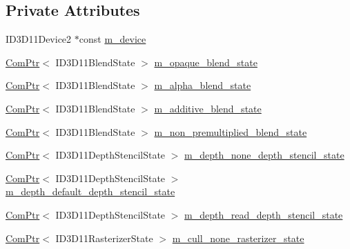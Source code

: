 \subsection*{Private Attributes}
\begin{DoxyCompactItemize}
\item 
I\+D3\+D11\+Device2 $\ast$const \hyperlink{structmage_1_1_rendering_state_cache_ad1846bcede5c3e6c8ce631b504b45cdf}{m\+\_\+device}
\item 
\hyperlink{namespacemage_ae74f374780900893caa5555d1031fd79}{Com\+Ptr}$<$ I\+D3\+D11\+Blend\+State $>$ \hyperlink{structmage_1_1_rendering_state_cache_ac655dae04386c2998677dff61704c975}{m\+\_\+opaque\+\_\+blend\+\_\+state}
\item 
\hyperlink{namespacemage_ae74f374780900893caa5555d1031fd79}{Com\+Ptr}$<$ I\+D3\+D11\+Blend\+State $>$ \hyperlink{structmage_1_1_rendering_state_cache_a4eda3c0aeeaca45e4e07358267bb8ae6}{m\+\_\+alpha\+\_\+blend\+\_\+state}
\item 
\hyperlink{namespacemage_ae74f374780900893caa5555d1031fd79}{Com\+Ptr}$<$ I\+D3\+D11\+Blend\+State $>$ \hyperlink{structmage_1_1_rendering_state_cache_ae29d186475c245d3eb5701005631c655}{m\+\_\+additive\+\_\+blend\+\_\+state}
\item 
\hyperlink{namespacemage_ae74f374780900893caa5555d1031fd79}{Com\+Ptr}$<$ I\+D3\+D11\+Blend\+State $>$ \hyperlink{structmage_1_1_rendering_state_cache_adaf1dd35ebb8e0ad9f2135ad0efee67a}{m\+\_\+non\+\_\+premultiplied\+\_\+blend\+\_\+state}
\item 
\hyperlink{namespacemage_ae74f374780900893caa5555d1031fd79}{Com\+Ptr}$<$ I\+D3\+D11\+Depth\+Stencil\+State $>$ \hyperlink{structmage_1_1_rendering_state_cache_a2dfd8ceaab6604f77bda85900d0ebd0a}{m\+\_\+depth\+\_\+none\+\_\+depth\+\_\+stencil\+\_\+state}
\item 
\hyperlink{namespacemage_ae74f374780900893caa5555d1031fd79}{Com\+Ptr}$<$ I\+D3\+D11\+Depth\+Stencil\+State $>$ \hyperlink{structmage_1_1_rendering_state_cache_ad7f220ca4bc92d814e3e9044b0edf7e2}{m\+\_\+depth\+\_\+default\+\_\+depth\+\_\+stencil\+\_\+state}
\item 
\hyperlink{namespacemage_ae74f374780900893caa5555d1031fd79}{Com\+Ptr}$<$ I\+D3\+D11\+Depth\+Stencil\+State $>$ \hyperlink{structmage_1_1_rendering_state_cache_af58f7cc04ca479493902eca2b4f349bc}{m\+\_\+depth\+\_\+read\+\_\+depth\+\_\+stencil\+\_\+state}
\item 
\hyperlink{namespacemage_ae74f374780900893caa5555d1031fd79}{Com\+Ptr}$<$ I\+D3\+D11\+Rasterizer\+State $>$ \hyperlink{structmage_1_1_rendering_state_cache_a3801dbdf6386c9534123d695cbde47c7}{m\+\_\+cull\+\_\+none\+\_\+rasterizer\+\_\+state}

\end{DoxyCompactItemize}
